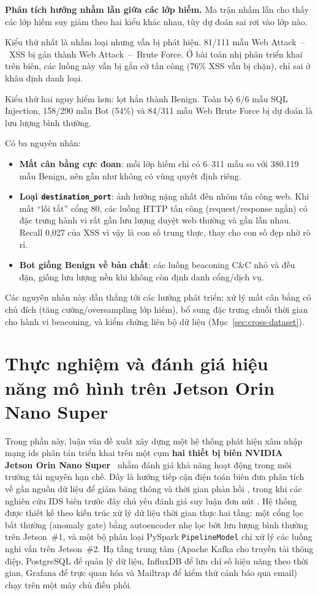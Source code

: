 \textbf{Phân tích hướng nhầm lẫn giữa các lớp hiếm.} Ma trận nhầm lẫn cho thấy các lớp hiếm suy giảm theo hai kiểu khác nhau, tùy dự đoán sai rơi vào lớp nào.

Kiểu thứ nhất là nhầm loại nhưng vẫn bị phát hiện. 81/111 mẫu Web Attack~--~XSS bị gán thành Web Attack~--~Brute Force. Ở bài toán nhị phân triển khai trên biên, các luồng này vẫn bị gắn cờ tấn công (76\% XSS vẫn bị chặn), chỉ sai ở khâu định danh loại.

Kiểu thứ hai nguy hiểm hơn: lọt hẳn thành Benign. Toàn bộ 6/6 mẫu SQL Injection, 158/290 mẫu Bot (54\%) và 84/311 mẫu Web Brute Force bị dự đoán là lưu lượng bình thường.

Có ba nguyên nhân:
\begin{itemize}
    \item \textbf{Mất cân bằng cực đoan}: mỗi lớp hiếm chỉ có 6--311 mẫu so với 380.119 mẫu Benign, nên gần như không có vùng quyết định riêng.
    \item \textbf{Loại \texttt{destination\_port}}: ảnh hưởng nặng nhất đến nhóm tấn công web. Khi mất ``lối tắt'' cổng 80, các luồng HTTP tấn công (request/response ngắn) có đặc trưng hành vi rất gần lưu lượng duyệt web thường và gần lẫn nhau. Recall 0{,}027 của XSS vì vậy là con số trung thực, thay cho con số đẹp nhờ rò rỉ.
    \item \textbf{Bot giống Benign về bản chất}: các luồng beaconing C\&C nhỏ và đều đặn, giống lưu lượng nền khi không còn định danh cổng/dịch vụ.
\end{itemize}

Các nguyên nhân này dẫn thẳng tới các hướng phát triển: xử lý mất cân bằng có chủ đích (tăng cường/oversampling lớp hiếm), bổ sung đặc trưng chuỗi thời gian cho hành vi beaconing, và kiểm chứng liên bộ dữ liệu (Mục~\ref{sec:cross-dataset}).

\clearpage
\section{Thực nghiệm và đánh giá hiệu năng mô hình trên Jetson Orin Nano Super}

Trong phần này, luận văn đề xuất xây dựng một hệ thống phát hiện xâm nhập mạng \ac{ids} phân tán triển khai trên một cụm \textbf{hai thiết bị biên NVIDIA Jetson Orin Nano Super}~\cite{nvidia2019jetson} nhằm đánh giá khả năng hoạt động trong môi trường tài nguyên hạn chế. Đây là hướng tiếp cận điện toán biên đưa phân tích về gần nguồn dữ liệu để giảm băng thông và thời gian phản hồi \cite{shi2016edge,hamdan2020edge}, trong khi các nghiên cứu IDS biên trước đây chủ yếu đánh giá suy luận đơn nút \cite{sforzin2016rpids}. Hệ thống được thiết kế theo kiến trúc xử lý dữ liệu thời gian thực hai tầng: một cổng lọc bất thường (anomaly gate) bằng autoencoder nhẹ lọc bớt lưu lượng bình thường trên Jetson~\#1, và một bộ phân loại PySpark \texttt{PipelineModel} chỉ xử lý các luồng nghi vấn trên Jetson~\#2. Hạ tầng trung tâm (Apache Kafka cho truyền tải thông điệp, PostgreSQL để quản lý dữ liệu, InfluxDB để lưu chỉ số hiệu năng theo thời gian, Grafana để trực quan hóa và Mailtrap để kiểm thử cảnh báo qua email) chạy trên một máy chủ điều phối.

